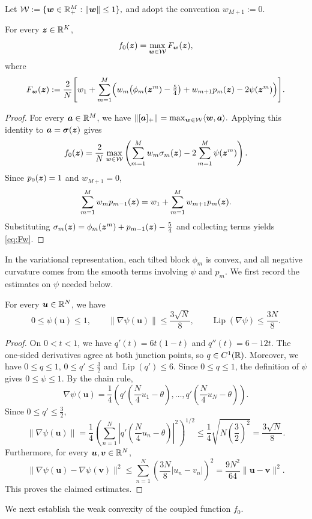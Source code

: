 Let
$
 \mathcal W
 :=
\{\bm w\in{\mathbb{R}}_+^M:\|\bm w\|\le1\},
$ and adopt the convention $w_{M+1}:=0$. 
\begin{lemma}
\label{lem:max-representation}
For every $\bm{z}\in{\mathbb{R}}^K$,
\[
 f_0(\bm{z})=\max_{\bm w\in\mathcal  W}F_{\bm w}(\bm{z}),
\]
where
\begin{equation}
 F_{\bm w}(\bm{z})
 :=
 \frac2N
 \Biggl[
 w_1+\sum_{m=1}^M
 \Bigl(
 w_m\bigl(\phi_m(\bm{z}^m)-\tfrac54\bigr)
 +w_{m+1}p_m(\bm{z})-2\psi(\bm{z}^m)
 \Bigr)
 \Biggr].
 \label{eq:Fw}
\end{equation}
\end{lemma}
\begin{proof}
For every $\bm{a}\in{\mathbb{R}}^M$, we have 
$
 \|[\bm{a}]_+\|
 =
 \max_{\bm w\in\mathcal W}\langle\bm w,\bm{a}\rangle.
$
Applying this identity to $\bm{a}=\boldsymbol{\sigma}(\bm{z})$
gives
\[
 f_0(\bm{z})
 =
 \frac2N
 \max_{\bm w\in\mathcal W}
 \left(
 \sum_{m=1}^M w_m\sigma_m(\bm{z})
 -2\sum_{m=1}^M\psi(\bm{z}^m)
 \right).
\]
Since $p_0(\bm{z})=1$ and $w_{M+1}=0$,
\[
 \sum_{m=1}^M w_m p_{m-1}(\bm{z})
 =
 w_1+\sum_{m=1}^M w_{m+1}p_m(\bm{z}).
\]
Substituting
$\sigma_m(\bm{z})=\phi_m(\bm{z}^m)+p_{m-1}(\bm{z})-\tfrac54$
and collecting terms yields \eqref{eq:Fw}.
\end{proof}
In the variational representation, each tilted block
$\phi_m$ is convex, and all negative curvature comes
from the smooth terms involving $\psi$ and $p_m$.
We first record the estimates on $\psi$ needed below.

\begin{lemma}
\label{lem:progress-regularity}
For every $\bm u\in{\mathbb{R}}^N$, we have
\[
 0\le\psi(\bm u)\le1,
 \qquad
 \|\nabla\psi(\bm u)\|\le\frac{3\sqrt N}{8},
 \qquad
 \operatorname{Lip}(\nabla\psi)\le\frac{3N}{8}.
\]
\end{lemma}

\begin{proof}
On $0<t<1$, we have $q'(t)=6t(1-t)$ and
$q''(t)=6-12t$. The one-sided derivatives agree at
both junction points, so $q\in C^1({\mathbb{R}})$. Moreover, we have $ 0\le q\le1$, $ 0\le q'\le\frac32$ and $ \operatorname{Lip}(q')\le6$.
Since $0\le q\le1$, the definition of $\psi$ gives
$0\le\psi\le1$. By the chain rule,
\[
 \nabla\psi(\bm u)
 =
 \frac14
 \left(
 q'\left(\frac N4u_1-\theta\right),
 \ldots,
 q'\left(\frac N4u_N-\theta\right)
 \right).
\]
Since $0\le q'\le\tfrac32$,
\[
 \|\nabla\psi(\bm u)\|
 =
 \frac14
 \left(
 \sum_{n=1}^N
 \left|q'\left(\frac N4u_n-\theta\right)\right|^2
 \right)^{1/2}
 \le
 \frac14\sqrt{N\left(\frac32\right)^2}
 =
 \frac{3\sqrt N}{8}.
\]
Furthermore, for every $\bm u,\bm v\in{\mathbb{R}}^N$,
\[
 \|\nabla\psi(\bm u)-\nabla\psi(\bm v)\|^2
 \le
 \sum_{n=1}^N
 \left(\frac{3N}{8}|u_n-v_n|\right)^2
 =
 \frac{9N^2}{64}\|\bm u-\bm v\|^2.
\]
This proves the claimed estimates.
\end{proof}
We next establish the weak convexity of the coupled
function $f_0$.

